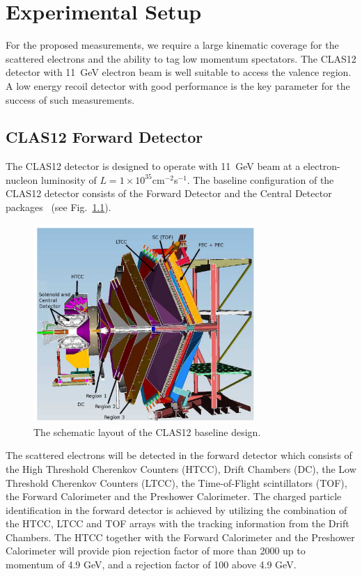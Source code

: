 \chapter{Experimental Setup}
\label{chap:setting}


For the proposed measurements, we require a large kinematic coverage for the scattered electrons and the ability to tag low momentum spectators. The CLAS12 detector with 11~GeV electron beam is well suitable to access the valence region. A low energy recoil detector with good performance is the key parameter for the success of such measurements.

\section{CLAS12 Forward Detector}
The CLAS12 detector is designed to operate with 11~GeV beam at a electron-nucleon luminosity of $L = 1\times10^{35}$cm$^{-2}$s$^{-1}$. The baseline configuration of the CLAS12 detector consists of the Forward Detector and the Central Detector packages~\cite{CD} (see Fig.~\ref{fig:fd}).

\begin{figure}
  \begin{center}
    \includegraphics[angle=0, width=0.75\textwidth]{./../Detector/fig-chap2/fd}
    \caption{The schematic layout of the CLAS12 baseline design.}
    \label{fig:fd}
  \end{center}
\end{figure}

The scattered electrons will be detected in the forward detector which consists of the High Threshold Cherenkov Counters (HTCC), Drift Chambers (DC), the Low Threshold Cherenkov Counters (LTCC), the Time-of-Flight scintillators (TOF), the Forward Calorimeter and the Preshower Calorimeter. The charged particle identification in the forward detector is achieved by utilizing the combination of the HTCC, LTCC and TOF arrays with the tracking information from the Drift Chambers. The HTCC together with the Forward Calorimeter and the Preshower Calorimeter will provide pion rejection factor of more than 2000 up to momentum of 4.9 GeV, and a rejection factor of 100 above 4.9 GeV.

